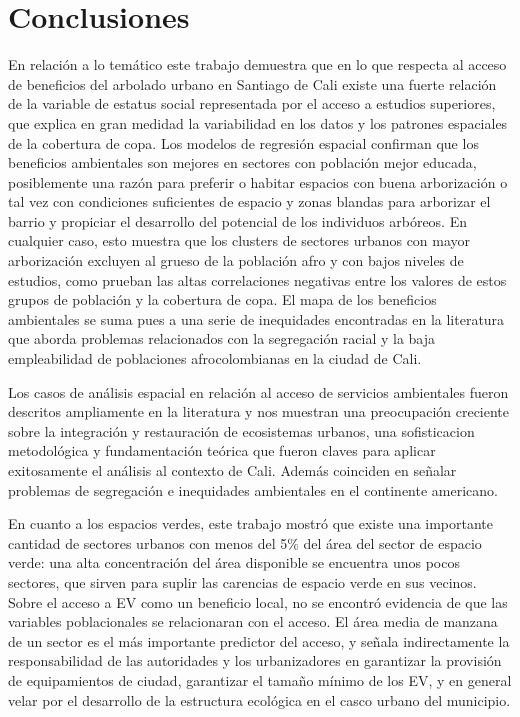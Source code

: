 \documentclass[12pt,a4paper,openany]{book}
\theoremstyle{definition}
\theoremstyle{definition}
\theoremstyle{definition}
\theoremstyle{remark}
\begin{document}
\chapter{Conclusiones}\label{conclusiones}

En relación a lo temático este trabajo demuestra que en lo que respecta
al acceso de beneficios del arbolado urbano en Santiago de Cali existe
una fuerte relación de la variable de estatus social representada por el
acceso a estudios superiores, que explica en gran medidad la
variabilidad en los datos y los patrones espaciales de la cobertura de
copa. Los modelos de regresión espacial confirman que los beneficios
ambientales son mejores en sectores con población mejor educada,
posiblemente una razón para preferir o habitar espacios con buena
arborización o tal vez con condiciones suficientes de espacio y zonas
blandas para arborizar el barrio y propiciar el desarrollo del potencial
de los individuos arbóreos. En cualquier caso, esto muestra que los
clusters de sectores urbanos con mayor arborización excluyen al grueso
de la población afro y con bajos niveles de estudios, como prueban las
altas correlaciones negativas entre los valores de estos grupos de
población y la cobertura de copa. El mapa de los beneficios ambientales
se suma pues a una serie de inequidades encontradas en la literatura que
aborda problemas relacionados con la segregación racial y la baja
empleabilidad de poblaciones afrocolombianas en la ciudad de Cali.

Los casos de análisis espacial en relación al acceso de servicios
ambientales fueron descritos ampliamente en la literatura y nos muestran
una preocupación creciente sobre la integración y restauración de
ecosistemas urbanos, una sofisticacion metodológica y fundamentación
teórica que fueron claves para aplicar exitosamente el análisis al
contexto de Cali. Además coinciden en señalar problemas de segregación e
inequidades ambientales en el continente americano.

En cuanto a los espacios verdes, este trabajo mostró que existe una
importante cantidad de sectores urbanos con menos del 5\% del área del
sector de espacio verde: una alta concentración del área disponible se
encuentra unos pocos sectores, que sirven para suplir las carencias de
espacio verde en sus vecinos. Sobre el acceso a EV como un beneficio
local, no se encontró evidencia de que las variables poblacionales se
relacionaran con el acceso. El área media de manzana de un sector es el
más importante predictor del acceso, y señala indirectamente la
responsabilidad de las autoridades y los urbanizadores en garantizar la
provisión de equipamientos de ciudad, garantizar el tamaño mínimo de los
EV, y en general velar por el desarrollo de la estructura ecológica en
el casco urbano del municipio.
\end{document}
